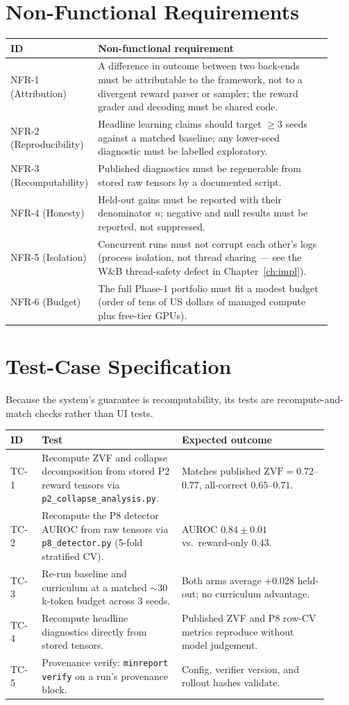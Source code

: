 \documentclass[12pt,a4paper]{report}
\newcommand{\zvf}{\mathrm{ZVF}}
\begin{document}
\section{Non-Functional Requirements}
\begin{longtable}{@{}L{0.10\linewidth}L{0.82\linewidth}@{}}
\toprule
\textbf{ID} & \textbf{Non-functional requirement} \\
\midrule
\endhead
NFR-1 (Attribution) & A difference in outcome between two back-ends must be
attributable to the framework, not to a divergent reward parser or sampler; the
reward grader and decoding must be shared code. \\
NFR-2 (Reproducibility) & Headline learning claims should target $\ge 3$ seeds
against a matched baseline; any lower-seed diagnostic must be labelled exploratory. \\
NFR-3 (Recomputability) & Published diagnostics must be regenerable from stored raw
tensors by a documented script. \\
NFR-4 (Honesty) & Held-out gains must be reported with their denominator $n$;
negative and null results must be reported, not suppressed. \\
NFR-5 (Isolation) & Concurrent runs must not corrupt each other's logs (process
isolation, not thread sharing --- see the W\&B thread-safety defect in
Chapter~\ref{ch:impl}). \\
NFR-6 (Budget) & The full Phase-1 portfolio must fit a modest budget (order of tens
of US dollars of managed compute plus free-tier GPUs). \\
\bottomrule
\end{longtable}

\section{Test-Case Specification}
Because the system's guarantee is recomputability, its tests are recompute-and-match
checks rather than UI tests.
\begin{longtable}{@{}L{0.09\linewidth}L{0.40\linewidth}L{0.42\linewidth}@{}}
\toprule
\textbf{ID} & \textbf{Test} & \textbf{Expected outcome} \\
\midrule
\endhead
TC-1 & Recompute ZVF and collapse decomposition from stored P2 reward tensors via
\texttt{p2\_collapse\_analysis.py}. & Matches published $\zvf=0.72$--$0.77$,
all-correct $0.65$--$0.71$. \\
TC-2 & Recompute the P8 detector AUROC from raw tensors via
\texttt{p8\_detector.py} (5-fold stratified CV). & AUROC $0.84\pm0.01$ vs.\
reward-only $0.43$. \\
TC-3 & Re-run baseline and curriculum at a matched ${\sim}30$k-token budget across
3 seeds. & Both arms average $+0.028$ held-out; no curriculum advantage. \\
TC-4 & Recompute headline diagnostics directly from stored tensors. &
Published ZVF and P8 row-CV metrics reproduce without model judgement. \\
TC-5 & Provenance verify: \texttt{minreport verify} on a run's provenance block. &
Config, verifier version, and rollout hashes validate. \\
\bottomrule
\end{longtable}
\end{document}
